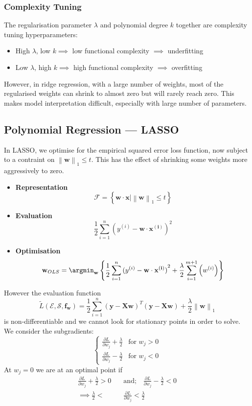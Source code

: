 \subsubsection{Complexity Tuning}
The regularisation parameter $\lambda$ and polynomial degree $k$ together are
complexity tuning hyperparameters:
\begin{itemize}
  \item High $\lambda$, low $k\implies$ low functional complexity $\implies$ underfitting
  \item Low $\lambda$, high $k \implies$ high functional complexity $\implies$ overfitting
\end{itemize}
However, in ridge regression, with a large number of weights, most of the
regularised weights can shrink to almost zero but will rarely reach zero. This
makes model interpretation difficult, especially with large number of
parameters.

\subsection{Polynomial Regression --- LASSO}
In LASSO, we optimise for the empirical squared error loss function, now
subject to a contraint on $\left\lVert \mathbf{w} \right\rVert_1 \le t$. This
has the effect of shrinking some weights more aggressively to zero.
\begin{itemize}
  \item \textbf{Representation} \[\mathcal{F}=\left\{ \mathbf{w\cdot x}|\left\lVert \mathbf{w} \right\rVert_1 \le t\right\}\]
  \item \textbf{Evaluation} \[\frac{1}{2}\sum_{i=1}^{n} {(y^{(i)}-\mathbf{w\cdot x^{(i)}})}^{2}\]
  \item \textbf{Optimisation} \[\mathbf{w}_{OLS}=\argmin_\mathbf{w}\left\{
    \frac{1}{2}\sum_{i=1}^{n} {(y^{(i)}-\mathbf{w\cdot x^{(i)}})}^{2}
+\frac{\lambda}{2}\sum_{i=1}^{m+1} {\left(w^{(i)}\right)}\right\}\]
\end{itemize}
However the evaluation function
\[\tilde{L}\left( \mathcal{E},\mathcal{S},\mathbf{f_w} \right)=\frac{1}{2}\sum_{i=1}^{n} {\left( \mathbf{y-Xw} \right)}^{T}\left( \mathbf{y-Xw} \right) +\frac{\lambda}{2}\left\lVert \mathbf{w} \right\rVert_1\] 
is non-differentiable and we cannot look for stationary points in order to
solve. We consider the subgradients:
\[\begin{cases}
  \frac{\partial L}{\partial w_j} +\frac{\lambda}{2} & \text{for } w_j>0\\
  \frac{\partial L}{\partial w_j} -\frac{\lambda}{2}& \text{for }w_j<0
\end{cases}\]
At $w_j=0$ we are at an optimal point if
\begin{align*}
  \frac{\partial L}{\partial w_j} +\frac{\lambda}{2}>0\quad & \text{and;}\quad \frac{\partial L}{\partial w_j} -\frac{\lambda}{2}<0\\
  \implies \frac{\lambda}{2}< &\frac{\partial L}{\partial w_j} <\frac{\lambda}{2}
\end{align*}
